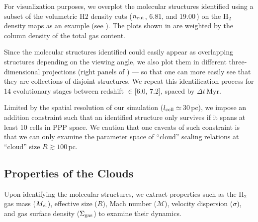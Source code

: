 \IfFileExists{emulateapjlegacy.cls}{\documentclass[iop]{emulateapjlegacy}}{\documentclass[iop]{emulateapj}}
\begin{document}
For visualization purposes, we overplot the molecular structures identified using a subset of the volumetric H2 density cuts
($n_{\rm cut}$, 6.81, and 19.00\,\cc) on the H$_2$ density maps as an example (see ). 
The plots shown in  are weighted by the column density of the total gas content.

Since the molecular structures identified could easily appear as overlapping structures depending on the viewing angle, we also plot them in different three-dimensional projections (right panels of ) --- so that one can more easily see that they are collections of disjoint structures.
%
We repeat this identification process for 14 evolutionary stages between redshift \z$\in$[6.0, 7.2], spaced by $\Delta t$\,Myr.

Limited by the spatial resolution of our simulation ($l_{\rm cell}\simeq$\,30\,pc), we impose an addition constraint such that an identified structure only survives if it spans at least 10 cells in PPP space. We caution that one caveats of such constraint is that we can only examine the parameter space of ``cloud'' scaling relations at ``cloud'' size $R\gtrsim100$\,pc.

\subsection{Properties of the Clouds}

Upon identifying the molecular structures, we extract properties such as the H$_2$ gas mass ($M_{\rm cl}$), effective size ($R$), Mach number ($\mathcal{M}$), velocity dispersion ($\sigma$), and gas surface density ($\Sigma_{\rm gas}$) to examine their dynamics.
\end{document}

